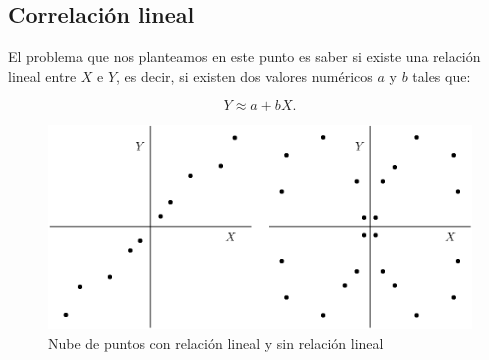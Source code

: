 \documentclass[12pt]{report}
\begin{document}
\subsection{Correlación lineal}

El problema que nos planteamos en este punto es    saber si existe una relación lineal
entre $X$ e $Y$, es decir, si existen dos valores numéricos $a$ y $b$ tales que:

$$Y\approx a +b X.$$

\begin{figure}
\begin{center}
\includegraphics{nube.eps}
\end{center}
 \caption{Nube de puntos con relación lineal y sin relación lineal}
\label{LINEAL}
\end{figure}
\end{document}
